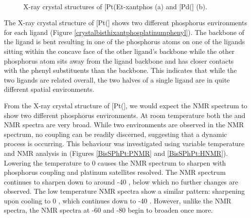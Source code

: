 \begin{figure}[htbp]
\begin{subfigure}[b]{0.45\textwidth}
	\caption{}
	\label{PdPhxantphos2}
\end{subfigure}
\\
\caption[X-ray crystal structures of [Pt(Et-xantphos\ce{)2}{]} and [Pd(\Phxantphos\ce{)2}{]}]{X-ray crystal structures of [Pt(Et-xantphos\ce{)2}{]} (a) and [Pd(\Phxantphos{}] (b).\cite{Grushin2006, Miedaner2004}}
\label{Mdiphosphine2}
\end{figure}

The X-ray crystal structure of [Pt(\Phthixantphos{}] shows two different phosphorus environments for each \Phthixantphos{} ligand (Figure \ref{crystalbisthixantphosplatinumphenyl}).  The backbone of the \Phthixantphos{} ligand is bent resulting in one of the phosphorus atoms on one of the ligands sitting within the concave face of the other ligand's backbone while the other phosphorus atom sits away from the ligand backbone and has closer contacts with the phenyl substituents than the backbone.  This indicates that while the two ligands are related overall, the two halves of a single ligand are in quite different spatial environments.  

From the X-ray crystal structure of [Pt(\Phthixantphos{}], we would expect the \phosphorus{} NMR spectrum to show two different phosphorus environments.  At room temperature both the \proton{} and \phosphorus{} NMR spectra are very broad.  While two environments are observed in the \phosphorus{} NMR spectrum, no coupling can be readily discerned, suggesting that a dynamic process is occurring. This behaviour was investigated using variable temperature \proton{} and \phosphorus{} NMR analysis in  (Figures \ref{BisSPhPt:PNMR} and \ref{BisSPhPt:HNMR}).  Lowering the temperature to 0 \degC{} causes the \phosphorus{} NMR spectrum to sharpen with phosphorus coupling and platinum satellites resolved.  The \phosphorus{} NMR spectrum continues to sharpen down to around -40 \degC, below which no further changes are observed.  The low temperature \proton{} NMR spectra show a similar pattern: sharpening upon cooling to 0 \degC, which continues down to -40 \degC.  However, unlike the \phosphorus{} NMR spectra, the \proton{} NMR spectra at -60 and -80 \degC{} begin to broaden once more.

